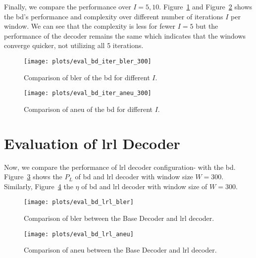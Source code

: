 Finally, we compare the performance over $I=5,10$. Figure~\ref{fig:eval_bd_iter_bler_300} and Figure~\ref{fig:eval_bd_iter_aneu_300} shows the \gls{bd}'s performance and complexity over different number of iterations $I$ per window. We can see that the complexity is less for fewer $I=5$ but the performance of the decoder remains the same which indicates that the windows converge quicker, not utilizing all 5 iterations.
\begin{figure}[htbp]
  \centering
  \texttt{[image: plots/eval\_bd\_iter\_bler\_300]}
  \caption[Comparison of \acrshort{bler} of the \acrshort{bd} for different $I$.]{Comparison of \gls{bler} of the \acrfull{bd} for different $I$.}
  \label{fig:eval_bd_iter_bler_300}
\end{figure}
\begin{figure}[htbp]
  \centering
  \texttt{[image: plots/eval\_bd\_iter\_aneu\_300]}
  \caption[Comparison of \acrshort{aneu} of the \acrshort{bd} for different $I$.]{Comparison of \gls{aneu} of the \acrfull{bd} for different $I$.}
  \label{fig:eval_bd_iter_aneu_300}
\end{figure}

\section{Evaluation of \texorpdfstring{\acrlong{lrl}}{LRL} Decoder}
Now, we compare the performance of \gls{lrl} decoder configuration- with the \gls{bd}. Figure~\ref{fig:eval_bd_lrl_bler} shows the $P_L$ of \gls{bd} and \gls{lrl} decoder with window size $W=300$. Similarly, Figure~\ref{fig:eval_bd_lrl_aneu} the $\eta$ of \gls{bd} and \gls{lrl} decoder with window size of $W=300$.
\begin{figure}[htbp]
  \centering
  \texttt{[image: plots/eval\_bd\_lrl\_bler]}
  \caption[Comparison of \acrshort{bler} between the Base Decoder and \acrshort{lrl} decoder.]{Comparison of \gls{bler} between the Base Decoder and \gls{lrl} decoder.}
  \label{fig:eval_bd_lrl_bler}
\end{figure}
\begin{figure}[htbp]
  \centering
  \texttt{[image: plots/eval\_bd\_lrl\_aneu]}
  \caption[Comparison of \acrshort{aneu} between the Base Decoder and \acrshort{lrl} decoder.]{Comparison of \gls{aneu} between the Base Decoder and \gls{lrl} decoder.}
  \label{fig:eval_bd_lrl_aneu}
\end{figure}

